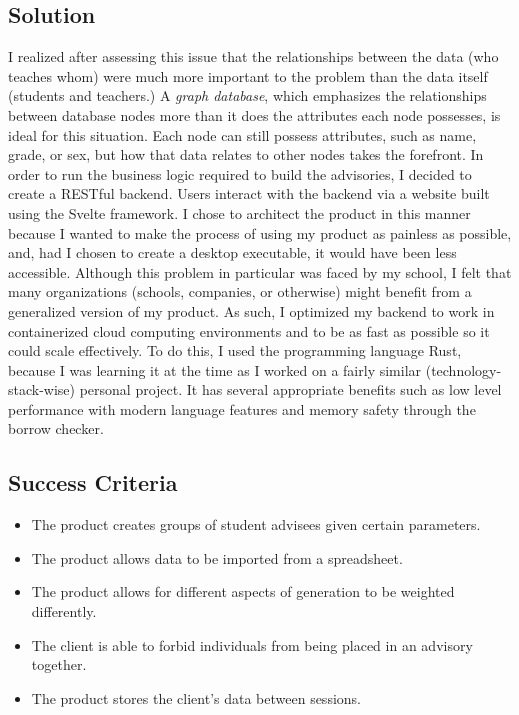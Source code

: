 \documentclass{paper}
\begin{document}
\subsection{Solution}
I realized after assessing this issue that the relationships between the data (who teaches whom) were much more important to the problem than the data itself (students and teachers.)
A \textit{graph database}, which emphasizes the relationships between database nodes more than it does the attributes each node possesses, is ideal for this situation.
Each node can still possess attributes, such as name, grade, or sex, but how that data relates to other nodes takes the forefront.
In order to run the business logic required to build the advisories, I decided to create a RESTful backend.
Users interact with the backend via a website built using the Svelte framework.
I chose to architect the product in this manner because I wanted to make the process of using my product as painless as possible, and, had I chosen to create a desktop executable, it would have been less accessible.
Although this problem in particular was faced by my school, I felt that many organizations (schools, companies, or otherwise) might benefit from a generalized version of my product.
As such, I optimized my backend to work in containerized cloud computing environments and to be as fast as possible so it could scale effectively.
To do this, I used the programming language Rust, because I was learning it at the time as I worked on a fairly similar (technology-stack-wise) personal project.
It has several appropriate benefits such as low level performance with modern language features and memory safety through the borrow checker.

\subsection{Success Criteria}
\begin{itemize}
  \itemsep-4pt
  \item The product creates groups of student advisees given certain parameters.
  \item The product allows data to be imported from a spreadsheet.
  \item The product allows for different aspects of generation to be weighted differently.
  \item The client is able to forbid individuals from being placed in an advisory together.
  \item The product stores the client's data between sessions.
\end{itemize}
\end{document}
